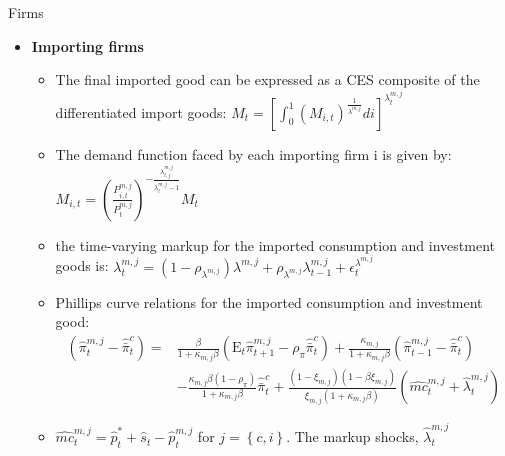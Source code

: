 \documentclass[9pt]{beamer}
\let\olditem\item
\renewcommand{\item}{%
\olditem\vspace{\fill}}
\begin{document}
\begin{frame}{Firms}
\begin{itemize}
    \item \textbf{Importing firms} 
    \begin{itemize}
        \item The final imported good can be expressed as a CES composite of the differentiated import goods: $M_{t}=\left[\int_{0}^{1}\left(M_{i, t}\right)^{\frac{1}{\lambda^{m, j}}} d i\right]^{\lambda_{t}^{m, j}}$
        
        \item The demand function faced by each importing firm i is given by: $M_{i, t}=\left(\frac{P_{i, t}^{m, j}}{P_{t}^{m, j}}\right)^{-\frac{\lambda_{t, j}^{m, j}}{\lambda_{t}^{m, j}-1}} M_{t}$ 
        
        \item  the time-varying markup for the imported consumption and investment goods is: $\lambda_{t}^{m, j}=\left(1-\rho_{\lambda^{m, j}}\right) \lambda^{m, j}+\rho_{\lambda^{m, j}} \lambda_{t-1}^{m, j}+\epsilon_{t}^{\lambda^{m, j}}$
        
        
        \item Phillips curve relations for the imported consumption and investment good:
$$\begin{aligned}
    \left(\widehat{\pi}_{t}^{m, j}-\widehat{\bar{\pi}}_{t}^{c}\right)=& \frac{\beta}{1+\kappa_{m, j} \beta}\left(\mathrm{E}_{t} \widehat{\pi}_{t+1}^{m, j}-\rho_{\pi} \widehat{\bar{\pi}}_{t}^{c}\right)+\frac{\kappa_{m, j}}{1+\kappa_{m, j} \beta}\left(\widehat{\pi}_{t-1}^{m, j}-\widehat{\bar{\pi}}_{t}^{c}\right) \\
    &-\frac{\kappa_{m, j} \beta\left(1-\rho_{\pi}\right)}{1+\kappa_{m, j} \beta} \widehat{\bar{\pi}}_{t}^{c}+\frac{\left(1-\xi_{m, j}\right)\left(1-\beta \xi_{m, j}\right)}{\xi_{m, j}\left(1+\kappa_{m, j} \beta\right)}\left(\widehat{m c}_{t}^{m, j}+\widehat{\lambda}_{t}^{m, j}\right)
    \end{aligned}
$$    

    \item $\widehat{m c}_{t}^{m, j} = \widehat{p}_t^{*} + \widehat{s}_t - \widehat{p}_t^{m,j}$ for $j = \left\{c,i \right\}$. The markup shocks, $\widehat{\lambda}_t^{m,j} $
    
    
    
    

\end{itemize}
\end{itemize}

\end{frame}
\end{document}
